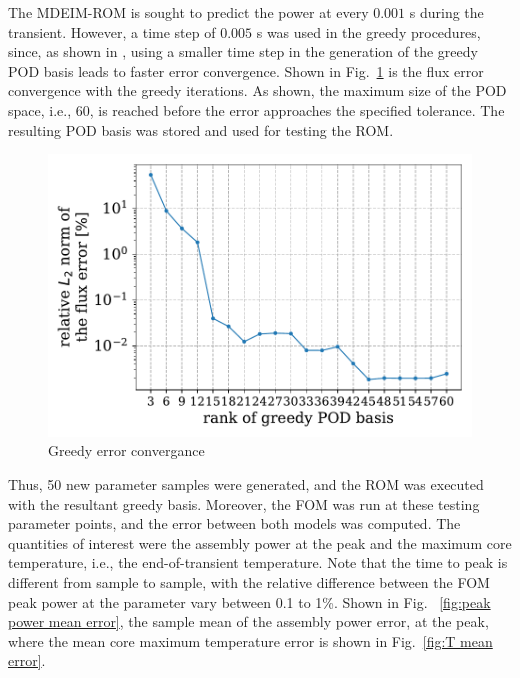 \documentclass[review,number,sort&compress,12pt]{elsarticle}
\begin{document}
The MDEIM-ROM is sought to predict the power at every $0.001$ s during the transient.
However, a time step of $0.005$ s was used in the greedy procedures, since, as shown in \cite{elzohery2021exploring}, using a smaller time step in the generation of the greedy POD basis leads to faster error convergence.
Shown in Fig.~\ref{fig:lra greedy error} is the flux error convergence with the greedy iterations.
As shown, the maximum size of the POD space, i.e., 60, is reached before the error approaches the specified tolerance.
The resulting POD basis was stored and used for testing the ROM.

\begin{figure}[H]
	\centering
	\includegraphics[width=0.9\linewidth]{../figures/greedy_convergance.pdf}
	\caption{Greedy error convergance}
	\label{fig:lra greedy error}
\end{figure}

Thus, 50 new parameter samples were generated, and the ROM was executed with the resultant greedy basis.
Moreover, the FOM was run at these testing parameter points, and the error between both models was computed.
The quantities of interest were the assembly power at the peak and the maximum core temperature, i.e., the end-of-transient temperature.
Note that the time to peak is different from sample to sample, with the relative difference between the FOM peak power at the parameter vary between 0.1 to 1\%.
Shown in Fig.~ \ref{fig:peak power mean error}, the sample mean of the assembly power error, at the peak, where the mean core maximum temperature error is shown in Fig.~\ref{fig:T mean error}.
\end{document}
